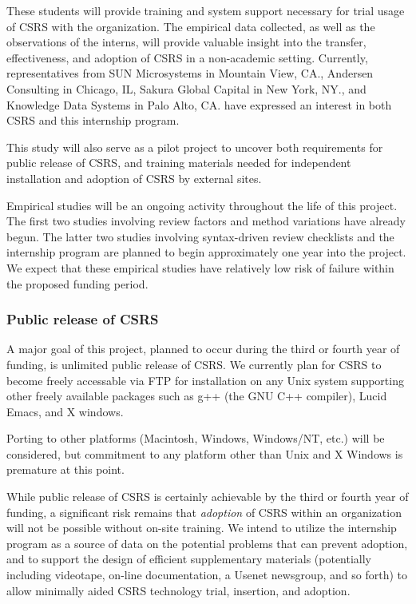 \begin{itemizenoindent}
  These students will provide training and system support necessary for trial
  usage of CSRS with the organization.  The empirical data collected, as well
  as the observations of the interns, will provide valuable insight into the
  transfer, effectiveness, and adoption of CSRS in a non-academic
  setting. Currently, representatives from SUN Microsystems in Mountain View,
  CA., Andersen Consulting in Chicago, IL, Sakura Global Capital in New
  York, NY., and Knowledge Data Systems in Palo Alto, CA. have expressed an
  interest in both CSRS and this internship program.
  
  This study will also serve as a pilot project to uncover both
  requirements for public release of CSRS, and training materials needed
  for independent installation and adoption of CSRS by external sites.

\end{itemizenoindent}

Empirical studies will be an ongoing activity throughout the life of this
project.  The first two studies involving review factors and method
variations have already begun.  The latter two studies involving
syntax-driven review checklists and the internship program are planned to
begin approximately one year into the project.  We expect that these
empirical studies have relatively low risk of failure within the proposed
funding period.

\subsubsection{Public release of CSRS}

A major goal of this project, planned to occur during the third or fourth
year of funding, is unlimited public release of CSRS.  We currently plan
for CSRS to become freely accessable via FTP for installation on any Unix
system supporting other freely available packages such as g++ (the GNU C++
compiler), Lucid Emacs, and X windows.

Porting to other platforms (Macintosh, Windows, Windows/NT, etc.) will be
considered, but commitment to any platform other than Unix and X Windows is
premature at this point.

While public release of CSRS is certainly achievable by the third or fourth
year of funding, a significant risk remains that {\em adoption}\/ of CSRS
within an organization will not be possible without on-site training.  We
intend to utilize the internship program as a source of data on the
potential problems that can prevent adoption, and to support the design of
efficient supplementary materials (potentially including videotape, on-line
documentation, a Usenet newsgroup, and so forth) to allow minimally aided
CSRS technology trial, insertion, and adoption.

